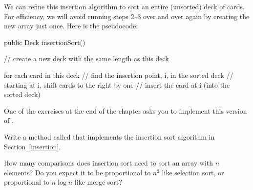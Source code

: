 We can refine this insertion algorithm to sort an entire (unsorted) deck of cards.
For efficiency, we will avoid running steps 2--3 over and over again by creating the new array just once.
Here is the pseudocode:

\begin{code}
public Deck insertionSort() {
    // create a new deck with the same length as this deck

    for each card in this deck {
        // find the insertion point, i, in the sorted deck
        // starting at i, shift cards to the right by one
        // insert the card at i (into the sorted deck)
    }
}
\end{code}

One of the exercises at the end of the chapter asks you to implement this version of .%




\item Write a method called  that implements the insertion sort algorithm in Section~\ref{insertion}.

\item How many comparisons does insertion sort need to sort an array with $n$ elements?
Do you expect it to be proportional to $n^2$ like selection sort, or proportional to $n \log n$ like merge sort?
